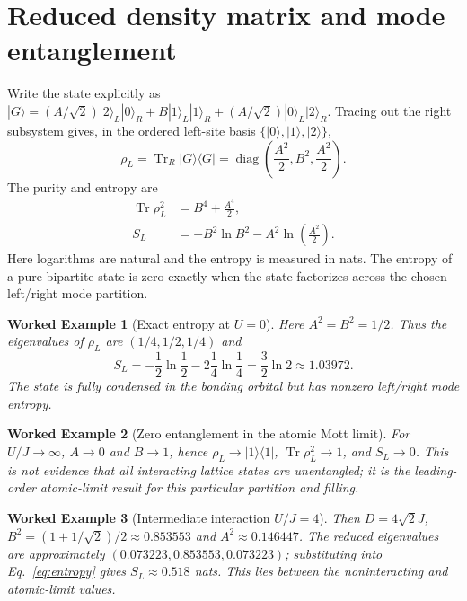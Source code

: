 \documentclass[11pt,a4paper]{article}
\newtheorem{example}{Worked Example}
\newcommand{\tr}{\operatorname{Tr}}
\begin{document}
\section{Reduced density matrix and mode entanglement}
Write the state explicitly as $|G\rangle=(A/\sqrt2)|2\rangle_L|0\rangle_R+B|1\rangle_L|1\rangle_R+(A/\sqrt2)|0\rangle_L|2\rangle_R$. Tracing out the right subsystem gives, in the ordered left-site basis $\{|0\rangle,|1\rangle,|2\rangle\}$,
\begin{equation}\boxed{\rho_L=\tr_R|G\rangle\langle G|=\operatorname{diag}\left(\frac{A^2}{2},B^2,\frac{A^2}{2}\right).}\end{equation}
The purity and entropy are
\begin{align}\tr\rho_L^2&=B^4+\frac{A^4}{2},\\S_L&=-B^2\ln B^2-A^2\ln\left(\frac{A^2}{2}\right).\label{eq:entropy}\end{align}
Here logarithms are natural and the entropy is measured in nats. The entropy of a pure bipartite state is zero exactly when the state factorizes across the chosen left/right mode partition.
\begin{example}[Exact entropy at $U=0$]
Here $A^2=B^2=1/2$. Thus the eigenvalues of $\rho_L$ are $(1/4,1/2,1/4)$ and
\begin{equation}S_L=-\frac12\ln\frac12-2\frac14\ln\frac14=\frac32\ln2\approx1.03972.\end{equation}
The state is fully condensed in the bonding orbital but has nonzero left/right \emph{mode} entropy.
\end{example}
\begin{example}[Zero entanglement in the atomic Mott limit]
For $U/J\to\infty$, $A\to0$ and $B\to1$, hence $\rho_L\to|1\rangle\langle1|$, $\tr\rho_L^2\to1$, and $S_L\to0$. This is not evidence that all interacting lattice states are unentangled; it is the leading-order atomic-limit result for this particular partition and filling.
\end{example}
\begin{example}[Intermediate interaction $U/J=4$]
Then $D=4\sqrt2 J$, $B^2=(1+1/\sqrt2)/2\approx0.853553$ and $A^2\approx0.146447$. The reduced eigenvalues are approximately $(0.073223,0.853553,0.073223)$; substituting into Eq.~\eqref{eq:entropy} gives $S_L\approx0.518$ nats. This lies between the noninteracting and atomic-limit values.
\end{example}
\end{document}
